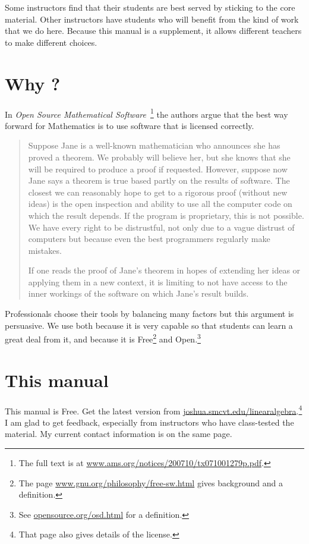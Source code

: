 Some instructors find that their students are best served by
sticking to the
core material.
Other instructors
have students who will benefit from the kind of work that
we do here.
Because this manual is a supplement, it allows different 
teachers to make different choices.


\section{Why \Sage?}
In 
\textit{Open Source Mathematical Software\,} 
\citep{JoynerStein07}\footnote{The full text is at
\protect\url{www.ams.org/notices/200710/tx071001279p.pdf}.}
the authors argue that the best way forward for Mathematics 
is to use software that is licensed correctly.

\begin{quotation}\small
Suppose Jane is a well-known mathematician who announces
she has proved a theorem. We probably will believe
her, but she knows that she will be required to produce
a proof if requested. However, suppose now Jane says a
theorem is true based partly on the results of software. The
closest we can reasonably hope to get to a rigorous proof
(without new ideas) is the open inspection and ability to use
all the computer code on which the result depends. If the
program is proprietary, this is not possible. We have every
right to be distrustful, not only due to a vague distrust of
computers but because even the best programmers regularly
make mistakes.

If one reads the proof of Jane’s theorem in hopes of
extending her ideas or applying them in a new context, it
is limiting to not have access to the inner workings of the
software on which Jane’s result builds.
\end{quotation}  
Professionals choose their tools by balancing many factors but
this argument is persuasive.
We use \Sage{} both because it is very capable 
so that students can 
learn a great deal from it,
and because it is 
Free\footnote{The page 
\protect\url{www.gnu.org/philosophy/free-sw.html} 
gives background and a definition.} 
and Open.\footnote{See \protect\url{opensource.org/osd.html} 
for a definition.} 



\section{This manual}
This manual is Free.
Get the latest version from 
\url{joshua.smcvt.edu/linearalgebra}.\footnote{%
  That page also gives details of the license.}
I am glad to get feedback, especially from instructors
who have class-tested the material.
My current contact information is on the same page.

